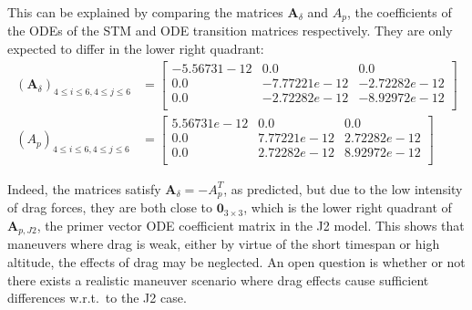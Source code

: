 This can be explained by comparing the matrices \(\mathbf{A}_\delta\) and \(A_p\), the coefficients of the ODEs of the STM and ODE transition matrices respectively. They are only expected to differ in the lower right quadrant:
\begin{align}
    (\mathbf{A}_\delta)_{4\leq i \leq 6, 4 \leq j \leq 6} &= \begin{bmatrix}
        -5.56731-12 & 0.0 & 0.0 \\
        0.0 & -7.77221e-12    & -2.72282e-12 \\
        0.0 & -2.72282e-12    & -8.92972e-12 \\
    \end{bmatrix} \\
    (A_p)_{4\leq i \leq 6, 4 \leq j \leq 6} &= \begin{bmatrix}
        5.56731e-12 & 0.0 & 0.0 \\
        0.0 & 7.77221e-12 & 2.72282e-12 \\
        0.0 & 2.72282e-12 & 8.92972e-12 \\
    \end{bmatrix}
\end{align}

Indeed, the matrices satisfy \(\mathbf{A}_\delta = - A_p^T\), as predicted, but due to the low intensity of drag forces, they are both close to \(\mathbf{0}_{3\times 3}\), which is the lower right quadrant of \(\mathbf{A}_{p, J2}\), the primer vector ODE coefficient matrix in the J2 model. This shows that maneuvers where drag is weak, either by virtue of the short timespan or high altitude, the effects of drag may be neglected. An open question is whether or not there exists a realistic maneuver scenario where drag effects cause sufficient differences w.r.t.\ to the J2 case.